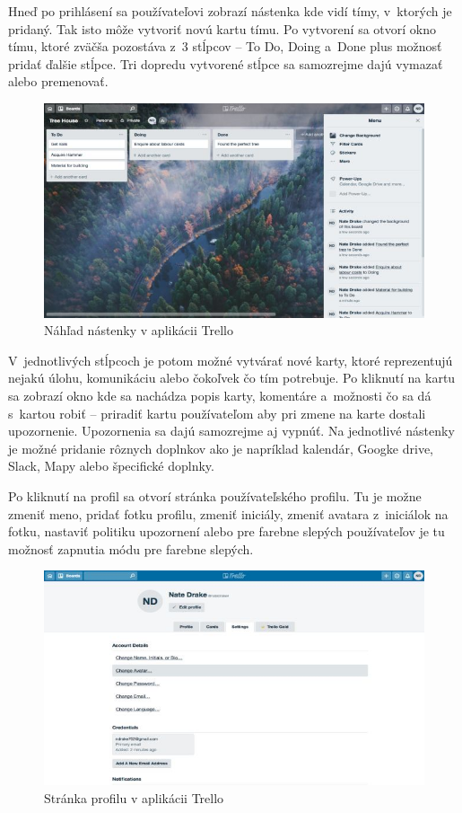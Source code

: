 \indent Hneď po prihlásení sa používateľovi zobrazí nástenka kde vidí tímy, v ktorých je pridaný. Tak isto môže vytvoriť novú kartu tímu. Po vytvorení sa otvorí okno tímu, ktoré zväčša pozostáva z 3 stĺpcov – To Do, Doing a Done plus možnosť pridať ďalšie stĺpce. Tri dopredu vytvorené stĺpce sa samozrejme dajú vymazať alebo premenovať. 

\begin{figure}[H]
    \centering
    \includegraphics[scale=0.65]{img/obr-trello.jpg}
    \caption{Náhľad nástenky v aplikácii Trello}
    \label{fig:nastenka}
\end{figure}

\indent V jednotlivých stĺpcoch je potom možné vytvárať nové karty, ktoré reprezentujú nejakú úlohu, komunikáciu alebo čokoľvek čo tím potrebuje. Po kliknutí na kartu sa zobrazí okno kde sa nachádza popis karty, komentáre a možnosti čo sa dá s kartou robiť – priradiť kartu používateľom aby pri zmene na karte dostali upozornenie. Upozornenia sa dajú samozrejme aj vypnúť. Na jednotlivé nástenky je možné pridanie rôznych doplnkov ako je napríklad kalendár, Googke drive, Slack, Mapy alebo špecifické doplnky. 

\indent Po kliknutí na profil sa otvorí stránka používateľského profilu. Tu je možne zmeniť meno, pridať fotku profilu, zmeniť iniciály, zmeniť avatara z iniciálok na fotku, nastaviť politiku upozornení alebo pre farebne slepých používateľov je tu možnosť zapnutia módu pre farebne slepých. 

\begin{figure}[H]
    \centering
    \includegraphics[scale=0.65]{img/obr-trello-profil.jpg}
    \caption{Stránka profilu v aplikácii Trello}
    \label{fig:profil}
\end{figure}

